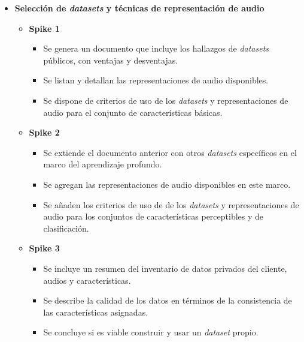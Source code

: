 \documentclass[
11pt, %
]{charter}
\begin{document}

\begin{itemize}
  \item \textbf{Selección de \textit{datasets} y técnicas de representación de audio}
    \begin{itemize}
      \item \textbf{Spike 1}
      \begin{itemize}
        \item Se genera un documento que incluye los hallazgos de \textit{datasets} públicos, con ventajas y desventajas.
        \item Se listan y detallan las representaciones de audio disponibles.
        \item Se dispone de criterios de uso de los \textit{datasets} y representaciones de audio para el conjunto de características básicas.
      \end{itemize}
      \item \textbf{Spike 2}
      \begin{itemize}
        \item Se extiende el documento anterior con otros \textit{datasets} específicos en el marco del aprendizaje profundo.
        \item Se agregan las representaciones de audio disponibles en este marco.
        \item Se añaden los criterios de uso de de los \textit{datasets} y representaciones de audio para los conjuntos de características perceptibles y de clasificación.
      \end{itemize}      
      \item \textbf{Spike 3}
      \begin{itemize}
        \item Se incluye un resumen del inventario de datos privados del cliente, audios y características.
        \item Se describe la calidad de los datos en términos de la consistencia de las características asignadas.
        \item Se concluye si es viable construir y usar un \textit{dataset} propio.
      \end{itemize}   
    \end{itemize}


\end{itemize}
\end{document}
